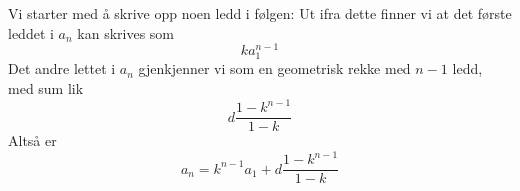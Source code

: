 \newpage
{}
Vi starter med å skrive opp noen ledd i følgen:
Ut ifra dette finner vi at det første leddet i $ a_n $ kan skrives som
\[ ka_1^{n-1} \]
Det andre lettet i $ a_n $ gjenkjenner vi som en geometrisk rekke med $ n-1 $ ledd, med sum lik
\[ d\frac{1-k^{n-1}}{1-k} \]
Altså er
\[ a_n = k^{n-1}a_1+d\frac{1-k^{n-1}}{1-k} \]

